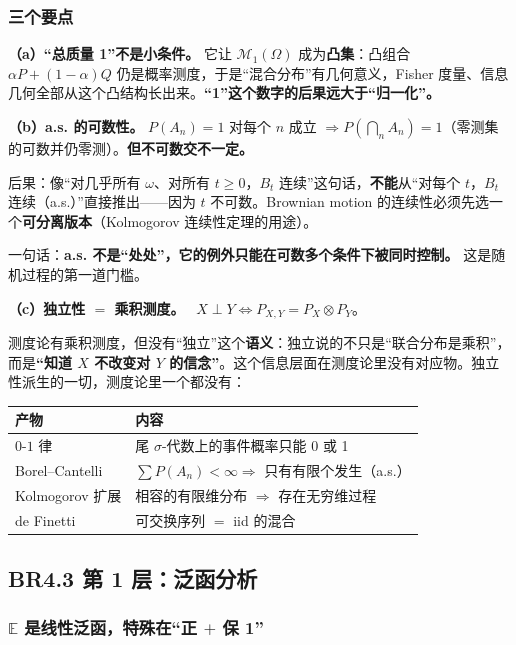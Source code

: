 \subsubsection{三个要点}

\textbf{（a）“总质量 1”不是小条件。} 它让 $\mathcal{M}_1(\Omega)$ 成为\textbf{凸集}：凸组合 $\alpha P+(1-\alpha)Q$ 仍是概率测度，于是“混合分布”有几何意义，Fisher 度量、信息几何全部从这个凸结构长出来。\textbf{“1”这个数字的后果远大于“归一化”。}

\textbf{（b）a.s. 的可数性。} $P(A_n)=1$ 对每个 $n$ 成立 $\Rightarrow P(\bigcap_n A_n)=1$（零测集的可数并仍零测）。\textbf{但不可数交不一定。}

后果：像“对几乎所有 $\omega$、对所有 $t\ge0$，$B_t$ 连续”这句话，\textbf{不能}从“对每个 $t$，$B_t$ 连续（a.s.）”直接推出——因为 $t$ 不可数。Brownian motion 的连续性必须先选一个\textbf{可分离版本}（Kolmogorov 连续性定理的用途）。

一句话：\textbf{a.s. 不是“处处”，它的例外只能在可数多个条件下被同时控制。} 这是随机过程的第一道门槛。

\textbf{（c）独立性 $=$ 乘积测度。} \ $X\perp Y\iff P_{X,Y}=P_X\otimes P_Y$。

测度论有乘积测度，但没有“独立”这个\textbf{语义}：独立说的不只是“联合分布是乘积”，而是\textbf{“知道 $X$ 不改变对 $Y$ 的信念”}。这个信息层面在测度论里没有对应物。独立性派生的一切，测度论里一个都没有：

\begin{center}
\begin{tabular}{L{4cm}L{8cm}}
\toprule
\textbf{产物} & \textbf{内容} \\
\midrule
$0$-$1$ 律 & 尾 $\sigma$-代数上的事件概率只能 0 或 1 \\
Borel--Cantelli & $\sum P(A_n)<\infty\Rightarrow$ 只有有限个发生（a.s.） \\
Kolmogorov 扩展 & 相容的有限维分布 $\Rightarrow$ 存在无穷维过程 \\
de Finetti & 可交换序列 $=$ iid 的混合 \\
\bottomrule
\end{tabular}
\end{center}

\subsection{BR4.3 第 1 层：泛函分析}

\subsubsection{$\mathbb{E}$ 是线性泛函，特殊在“正 $+$ 保 1”}

